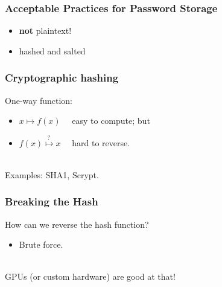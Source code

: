 \documentclass[aspectratio=43]{beamer}
\newenvironment{changemargin}[1]{%
  \begin{list}{}{%
    \setlength{\topsep}{0pt}%
    \setlength{\leftmargin}{#1}%
    \setlength{\rightmargin}{1em}
    \setlength{\listparindent}{\parindent}%
    \setlength{\itemindent}{\parindent}%
    \setlength{\parsep}{\parskip}%
  }%
  \item[]}{\end{list}}
\begin{document}
\begin{frame}
  \frametitle{Acceptable Practices for Password Storage}
  \begin{changemargin}{2cm}
    \begin{itemize}
    \item {\Huge \alert{{\bf not} plaintext!}}
    \item \Large hashed and salted
    \end{itemize}
       
\end{changemargin}
\end{frame}

\begin{frame}
  \frametitle{Cryptographic hashing}
  \begin{changemargin}{2cm}
    One-way function:
    \begin{itemize}
    \item $x \mapsto f(x)$ ~~easy to compute; but
      \item $f(x) \stackrel{?~}{\mapsto} x$ ~~hard to reverse.
    \end{itemize}~\\
    Examples: SHA1, Scrypt.
\end{changemargin}
\end{frame}

\begin{frame}
  \frametitle{Breaking the Hash}
  \begin{changemargin}{2cm}
    How can we reverse the hash function?
    \begin{itemize}
    \item    Brute force.
    \end{itemize}~\\
    GPUs (or custom hardware) are good at that!
  \end{changemargin}
\end{frame}
\end{document}
